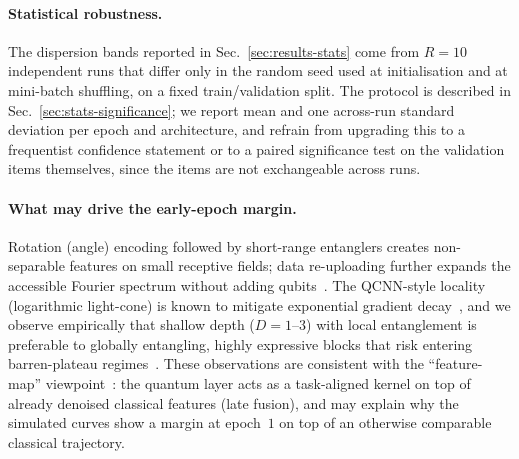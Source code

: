 \paragraph{Statistical robustness.}
The dispersion bands reported in Sec.~\ref{sec:results-stats} come from $R=10$ independent runs that differ only in the random seed used at initialisation and at mini-batch shuffling, on a fixed train/validation split. The protocol is described in Sec.~\ref{sec:stats-significance}; we report mean and one across-run standard deviation per epoch and architecture, and refrain from upgrading this to a frequentist confidence statement or to a paired significance test on the validation items themselves, since the items are not exchangeable across runs.

\paragraph{What may drive the early-epoch margin.}
Rotation (angle) encoding followed by short-range entanglers creates non-separable features on small receptive fields; data re-uploading further expands the accessible Fourier spectrum without adding qubits~\cite{PerezSalinas2020,Schuld2020Expressivity}. The QCNN-style locality (logarithmic light-cone) is known to mitigate exponential gradient decay~\cite{Pesah2021PRX}, and we observe empirically that shallow depth ($D{=}1$–$3$) with local entanglement is preferable to globally entangling, highly expressive blocks that risk entering barren-plateau regimes~\cite{McClean2018,Marrero2021PRXQ,Holmes2022PRXQ}. These observations are consistent with the ``feature-map'' viewpoint~\cite{Havlicek2019,Schuld2019PRA}: the quantum layer acts as a task-aligned kernel on top of already denoised classical features (late fusion), and may explain why the simulated curves show a margin at epoch~$1$ on top of an otherwise comparable classical trajectory.



